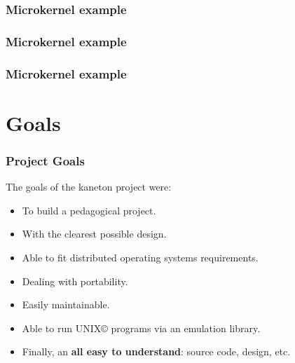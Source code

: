 \begin{frame}
  \frametitle{Microkernel example}

  \begin{center}
  \end{center}
\end{frame}

\begin{frame}
  \frametitle{Microkernel example}

  \begin{center}
  \end{center}
\end{frame}

\begin{frame}
  \frametitle{Microkernel example}

  \begin{center}
  \end{center}
\end{frame}


%
%

\section{Goals}


\begin{frame}
  \frametitle{Project Goals}

  The goals of the kaneton project were:

  \begin{itemize}[<+->]
    \item
      To build a pedagogical project.
    \item
      With the clearest possible design.
    \item
      Able to fit distributed operating systems requirements.
    \item
      Dealing with portability.
    \item
      Easily maintainable.
    \item
      Able to run UNIX{\scriptsize \copyright} programs via
      an emulation library.
    \item
      Finally, an \textbf{all easy to understand}: source code, design,
      etc.
  \end{itemize}
\end{frame}

%
%

